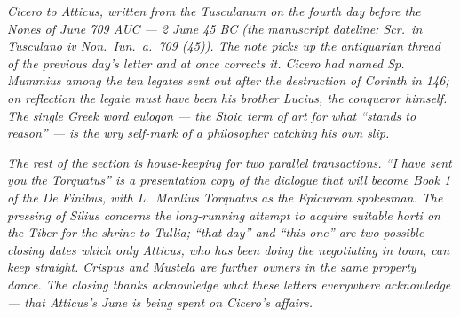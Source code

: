 
\textit{Cicero to Atticus, written from the Tusculanum
on the fourth day before the Nones of June 709 AUC
--- 2 June 45 BC (the manuscript dateline:
\textit{Scr.\ in Tusculano iv Non.\ Iun.\ a.\ 709
(45)}). The note picks up the antiquarian thread of
the previous day's letter and at once corrects it.
Cicero had named Sp. Mummius among the ten legates
sent out after the destruction of Corinth in 146; on
reflection the legate must have been his brother
Lucius, the conqueror himself. The single Greek word
\textit{eulogon} --- the Stoic term of art for what
``stands to reason'' --- is the wry self-mark of a
philosopher catching his own slip.}

\textit{The rest of the section is house-keeping for
two parallel transactions. ``I have sent you the
\textit{Torquatus}'' is a presentation copy of the
dialogue that will become Book 1 of the \textit{De
Finibus}, with L.~Manlius Torquatus as the
Epicurean spokesman. The pressing of Silius
concerns the long-running attempt to acquire
suitable \textit{horti} on the Tiber for the
shrine to Tullia; ``that day'' and ``this one'' are
two possible closing dates which only Atticus, who
has been doing the negotiating in town, can keep
straight. Crispus and Mustela are further owners
in the same property dance. The closing thanks
acknowledge what these letters everywhere
acknowledge --- that Atticus's June is being spent
on Cicero's affairs.}
